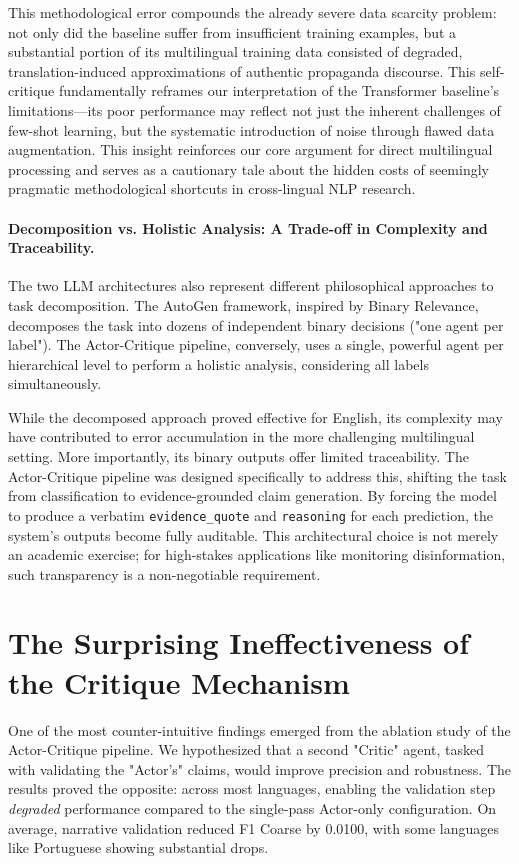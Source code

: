 This methodological error compounds the already severe data scarcity problem: not only did the baseline suffer from insufficient training examples, but a substantial portion of its multilingual training data consisted of degraded, translation-induced approximations of authentic propaganda discourse. This self-critique fundamentally reframes our interpretation of the Transformer baseline's limitations—its poor performance may reflect not just the inherent challenges of few-shot learning, but the systematic introduction of noise through flawed data augmentation. This insight reinforces our core argument for direct multilingual processing and serves as a cautionary tale about the hidden costs of seemingly pragmatic methodological shortcuts in cross-lingual NLP research.

\paragraph{Decomposition vs. Holistic Analysis: A Trade-off in Complexity and Traceability.}
The two LLM architectures also represent different philosophical approaches to task decomposition. The AutoGen framework, inspired by Binary Relevance, decomposes the task into dozens of independent binary decisions ("one agent per label"). The Actor-Critique pipeline, conversely, uses a single, powerful agent per hierarchical level to perform a holistic analysis, considering all labels simultaneously.

While the decomposed approach proved effective for English, its complexity may have contributed to error accumulation in the more challenging multilingual setting. More importantly, its binary outputs offer limited traceability. The Actor-Critique pipeline was designed specifically to address this, shifting the task from classification to evidence-grounded claim generation. By forcing the model to produce a verbatim \texttt{evidence\_quote} and \texttt{reasoning} for each prediction, the system's outputs become fully auditable. This architectural choice is not merely an academic exercise; for high-stakes applications like monitoring disinformation, such transparency is a non-negotiable requirement.

\section{The Surprising Ineffectiveness of the Critique Mechanism}

One of the most counter-intuitive findings emerged from the ablation study of the Actor-Critique pipeline. We hypothesized that a second "Critic" agent, tasked with validating the "Actor's" claims, would improve precision and robustness. The results proved the opposite: across most languages, enabling the validation step \emph{degraded} performance compared to the single-pass Actor-only configuration. On average, narrative validation reduced F1 Coarse by 0.0100, with some languages like Portuguese showing substantial drops.

